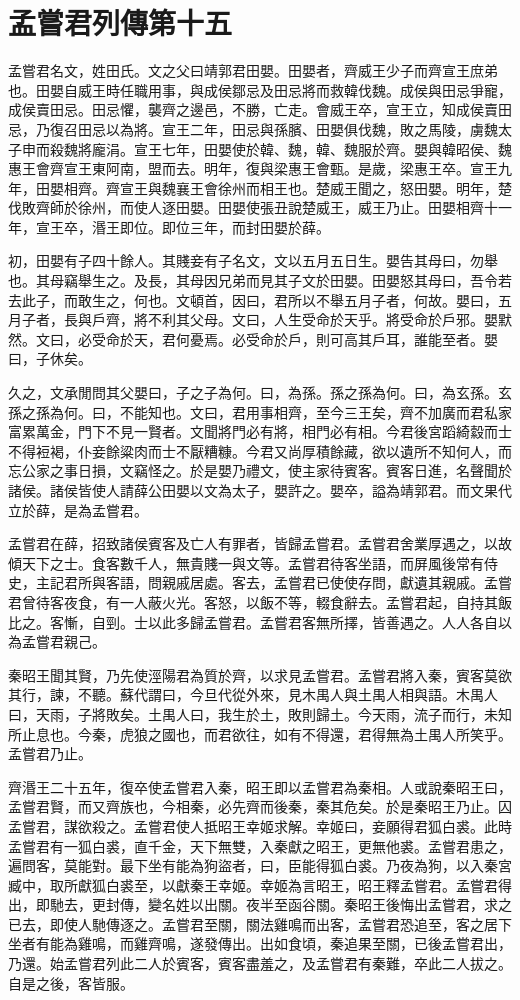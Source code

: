 \chapter{孟嘗君列傳第十五}

孟嘗君名文，姓田氏。文之父曰靖郭君田嬰。田嬰者，齊威王少子而齊宣王庶弟也。田嬰自威王時任職用事，與成侯鄒忌及田忌將而救韓伐魏。成侯與田忌爭寵，成侯賣田忌。田忌懼，襲齊之邊邑，不勝，亡走。會威王卒，宣王立，知成侯賣田忌，乃復召田忌以為將。宣王二年，田忌與孫臏、田嬰俱伐魏，敗之馬陵，虜魏太子申而殺魏將龐涓。宣王七年，田嬰使於韓、魏，韓、魏服於齊。嬰與韓昭侯、魏惠王會齊宣王東阿南，盟而去。明年，復與梁惠王會甄。是歲，梁惠王卒。宣王九年，田嬰相齊。齊宣王與魏襄王會徐州而相王也。楚威王聞之，怒田嬰。明年，楚伐敗齊師於徐州，而使人逐田嬰。田嬰使張丑說楚威王，威王乃止。田嬰相齊十一年，宣王卒，湣王即位。即位三年，而封田嬰於薛。

初，田嬰有子四十餘人。其賤妾有子名文，文以五月五日生。嬰告其母曰，勿舉也。其母竊舉生之。及長，其母因兄弟而見其子文於田嬰。田嬰怒其母曰，吾令若去此子，而敢生之，何也。文頓首，因曰，君所以不舉五月子者，何故。嬰曰，五月子者，長與戶齊，將不利其父母。文曰，人生受命於天乎。將受命於戶邪。嬰默然。文曰，必受命於天，君何憂焉。必受命於戶，則可高其戶耳，誰能至者。嬰曰，子休矣。

久之，文承閒問其父嬰曰，子之子為何。曰，為孫。孫之孫為何。曰，為玄孫。玄孫之孫為何。曰，不能知也。文曰，君用事相齊，至今三王矣，齊不加廣而君私家富累萬金，門下不見一賢者。文聞將門必有將，相門必有相。今君後宮蹈綺縠而士不得裋褐，仆妾餘粱肉而士不厭糟糠。今君又尚厚積餘藏，欲以遺所不知何人，而忘公家之事日損，文竊怪之。於是嬰乃禮文，使主家待賓客。賓客日進，名聲聞於諸侯。諸侯皆使人請薛公田嬰以文為太子，嬰許之。嬰卒，謚為靖郭君。而文果代立於薛，是為孟嘗君。

孟嘗君在薛，招致諸侯賓客及亡人有罪者，皆歸孟嘗君。孟嘗君舍業厚遇之，以故傾天下之士。食客數千人，無貴賤一與文等。孟嘗君待客坐語，而屏風後常有侍史，主記君所與客語，問親戚居處。客去，孟嘗君已使使存問，獻遺其親戚。孟嘗君曾待客夜食，有一人蔽火光。客怒，以飯不等，輟食辭去。孟嘗君起，自持其飯比之。客慚，自剄。士以此多歸孟嘗君。孟嘗君客無所擇，皆善遇之。人人各自以為孟嘗君親己。

秦昭王聞其賢，乃先使涇陽君為質於齊，以求見孟嘗君。孟嘗君將入秦，賓客莫欲其行，諫，不聽。蘇代謂曰，今旦代從外來，見木禺人與土禺人相與語。木禺人曰，天雨，子將敗矣。土禺人曰，我生於土，敗則歸土。今天雨，流子而行，未知所止息也。今秦，虎狼之國也，而君欲往，如有不得還，君得無為土禺人所笑乎。孟嘗君乃止。

齊湣王二十五年，復卒使孟嘗君入秦，昭王即以孟嘗君為秦相。人或說秦昭王曰，孟嘗君賢，而又齊族也，今相秦，必先齊而後秦，秦其危矣。於是秦昭王乃止。囚孟嘗君，謀欲殺之。孟嘗君使人抵昭王幸姬求解。幸姬曰，妾願得君狐白裘。此時孟嘗君有一狐白裘，直千金，天下無雙，入秦獻之昭王，更無他裘。孟嘗君患之，遍問客，莫能對。最下坐有能為狗盜者，曰，臣能得狐白裘。乃夜為狗，以入秦宮臧中，取所獻狐白裘至，以獻秦王幸姬。幸姬為言昭王，昭王釋孟嘗君。孟嘗君得出，即馳去，更封傳，變名姓以出關。夜半至函谷關。秦昭王後悔出孟嘗君，求之已去，即使人馳傳逐之。孟嘗君至關，關法雞鳴而出客，孟嘗君恐追至，客之居下坐者有能為雞鳴，而雞齊鳴，遂發傳出。出如食頃，秦追果至關，已後孟嘗君出，乃還。始孟嘗君列此二人於賓客，賓客盡羞之，及孟嘗君有秦難，卒此二人拔之。自是之後，客皆服。

